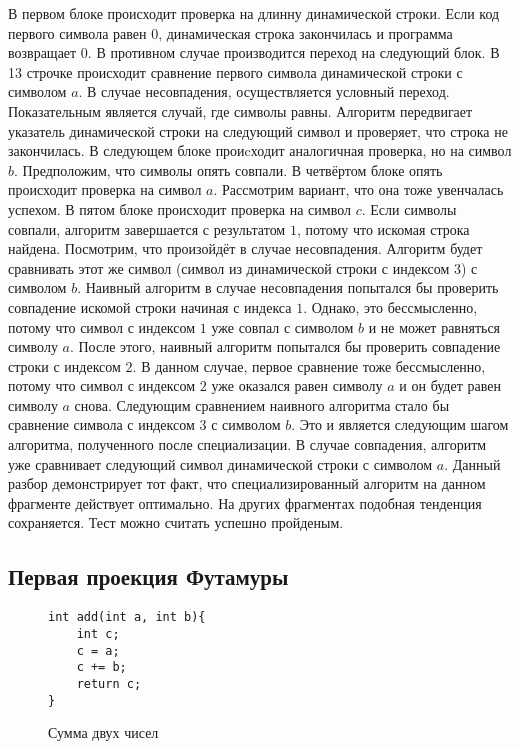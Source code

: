\documentclass{spbau-diploma}
\begin{document}
В первом блоке происходит проверка на длинну динамической строки. Если код первого символа равен $0$, динамическая строка закончилась и программа возвращает $0$. В противном случае производится переход на следующий блок. В 13 строчке происходит сравнение первого символа динамической строки с символом $a$. В случае несовпадения, осуществляется условный переход. Показательным является случай, где символы равны. Алгоритм передвигает указатель динамической строки на следующий символ и проверяет, что строка не закончилась. В следующем блоке проиcходит аналогичная проверка, но на символ $b$. Предположим, что символы опять совпали. В четвёртом блоке опять происходит проверка на символ $a$. Рассмотрим вариант, что она тоже увенчалась успехом. В пятом блоке происходит проверка на символ $c$. Если символы совпали, алгоритм завершается с результатом $1$, потому что искомая строка найдена. Посмотрим, что произойдёт в случае несовпадения. Алгоритм будет сравнивать этот же символ (символ из динамической строки с индексом 3) с символом $b$. Наивный алгоритм в случае несовпадения попытался бы проверить совпадение искомой строки начиная с индекса $1$. Однако, это бессмысленно, потому что символ с индексом $1$ уже совпал с символом $b$ и не может равняться символу $a$. После этого, наивный алгоритм попытался бы проверить совпадение строки с индексом $2$. В данном случае, первое сравнение тоже бессмысленно, потому что символ с индексом $2$ уже оказался равен символу $a$ и он будет равен символу $a$ снова. Следующим сравнением наивного алгоритма стало бы сравнение символа с индексом $3$ с символом $b$. Это и является следующим шагом алгоритма, полученного после специализации. В случае совпадения, алгоритм уже сравнивает следующий символ динамической строки с символом $a$. Данный разбор демонстрирует тот факт, что специализированный алгоритм на данном фрагменте действует оптимально. На других фрагментах подобная тенденция сохраняется. Тест можно считать успешно пройденым.

\subsection{ Первая проекция Футамуры}

\begin{wrapfigure}{r}{0.4\textwidth}
\begin{lstlisting}[xleftmargin = 20pt]
int add(int a, int b){
    int c;
    c = a;
    c += b;
    return c;
}
\end{lstlisting}
\caption{ Сумма двух чисел}
\label{fig:add}
\end{wrapfigure}
\end{document}
